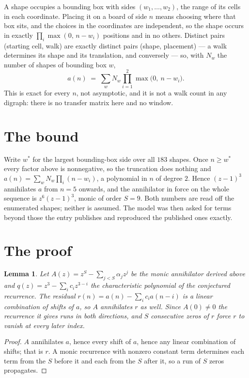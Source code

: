\documentclass[11pt,a4paper]{article}
\theoremstyle{plain}
\newtheorem{lemma}[theorem]{Lemma}
\theoremstyle{definition}
\begin{document}
A shape occupies a bounding box with sides $(w_1,\dots,w_{2})$, the range of its cells in each
coordinate. Placing it on a board of side $n$ means choosing where that box sits, and the
choices in the coordinates are independent, so the shape occurs in exactly
$\prod_{i}\max(0,\,n-w_i)$ positions and in no others. Distinct pairs (starting cell,
walk) are exactly distinct pairs (shape, placement) --- a walk determines its shape and its
translation, and conversely --- so, with $N_w$ the number of shapes of bounding box $w$,
\[
a(n)\;=\;\sum_{w} N_w \prod_{i=1}^{2}\max\bigl(0,\ n-w_i\bigr).
\]
This is exact for every $n$, not asymptotic, and it is not a walk count in any digraph: there is
no transfer matrix here and no window.

\section{The bound}

Write $w^\ast$ for the largest bounding-box side over all $183$ shapes. Once $n\ge w^\ast$
every factor above is nonnegative, so the truncation does nothing and
$a(n)=\sum_w N_w\prod_i(n-w_i)$, a polynomial in $n$ of degree $2$. Hence $(z-1)^{3}$
annihilates $a$ from $n=5$ onwards, and the annihilator in force on the whole sequence is
$z^{6}(z-1)^{3}$, monic of order $S=9$. Both numbers are read off the enumerated
shapes; neither is assumed. The model was then asked for terms beyond those the entry publishes
and reproduced the published ones exactly.

\section{The proof}

\begin{lemma}\label{lem:crit}
Let $A(z)=z^S-\sum_{j<S}\alpha_jz^{j}$ be the monic annihilator derived above and
$q(z)=z^{3}-\sum_ic_iz^{3-i}$ the characteristic polynomial of the conjectured
recurrence. The residual $r(n)=a(n)-\sum_ic_ia(n-i)$ is a linear combination of shifts of $a$,
so $A$ annihilates $r$ as well. Since $A(0)\ne0$ the recurrence it gives runs in both
directions, and $S$ consecutive zeros of $r$ force $r$ to vanish at every later index.
\end{lemma}

\begin{proof}
$A$ annihilates $a$, hence every shift of $a$, hence any linear combination of shifts; that is
$r$. A monic recurrence with nonzero constant term determines each term from the $S$ before it
and each from the $S$ after it, so a run of $S$ zeros propagates.
\end{proof}
\end{document}
